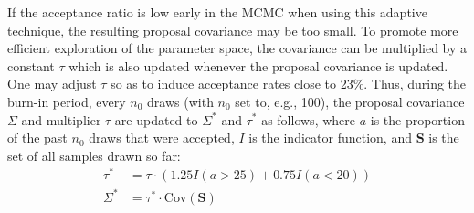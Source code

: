 \documentclass{article}
\begin{document}


If the acceptance ratio is low early in the MCMC when using this adaptive technique, the resulting proposal covariance may be too small. To promote more efficient exploration of the parameter space, the covariance can be multiplied by a constant $\tau$ which is also updated whenever the proposal covariance is updated. One may adjust $\tau$ so as to induce acceptance rates close to 23\%. Thus, during the burn-in period, every $n_0$ draws (with $n_0$ set to, e.g., 100), the proposal covariance $\Sigma$ and multiplier $\tau$ are updated to $\Sigma^*$ and $\tau^*$ as follows, where $a$ is the proportion of the past $n_0$ draws that were accepted, $I$ is the indicator function, and $\mathbf S$ is the set of all samples drawn so far:
\begin{equation}
\begin{aligned}
\tau^* &= \tau \cdot (1.25  I(a>25) + 0.75 I(a<20))\\
\Sigma^* &= \tau^* \cdot \mathrm{Cov}(\mathbf S)
\end{aligned}
\end{equation}
\end{document}
